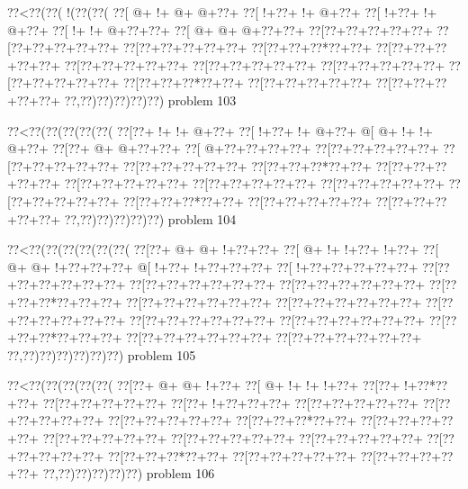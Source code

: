 \vbox{\vbox{\goo
\0??<\0??(\0??(\- !(\0??(\0??(
\0??[\- @+\- !+\- @+\- @+\0??+
\0??[\- !+\0??+\- !+\- @+\0??+
\0??[\- !+\0??+\- !+\- @+\0??+
\0??[\- !+\- !+\- @+\0??+\0??+
\0??[\- @+\- @+\- @+\0??+\0??+
\0??[\0??+\0??+\0??+\0??+\0??+
\0??[\0??+\0??+\0??+\0??+\0??+
\0??[\0??+\0??+\0??+\0??+\0??+
\0??[\0??+\0??+\0??*\0??+\0??+
\0??[\0??+\0??+\0??+\0??+\0??+
\0??[\0??+\0??+\0??+\0??+\0??+
\0??[\0??+\0??+\0??+\0??+\0??+
\0??[\0??+\0??+\0??+\0??+\0??+
\0??[\0??+\0??+\0??+\0??+\0??+
\0??[\0??+\0??+\0??*\0??+\0??+
\0??[\0??+\0??+\0??+\0??+\0??+
\0??[\0??+\0??+\0??+\0??+\0??+
\0??,\0??)\0??)\0??)\0??)\0??)
}
\hfil problem 103\hfil\break
}

\vbox{\vbox{\goo
\0??<\0??(\0??(\0??(\0??(\0??(
\0??[\0??+\- !+\- !+\- @+\0??+
\0??[\- !+\0??+\- !+\- @+\0??+
\- @[\- @+\- !+\- !+\- @+\0??+
\0??[\0??+\- @+\- @+\0??+\0??+
\0??[\- @+\0??+\0??+\0??+\0??+
\0??[\0??+\0??+\0??+\0??+\0??+
\0??[\0??+\0??+\0??+\0??+\0??+
\0??[\0??+\0??+\0??+\0??+\0??+
\0??[\0??+\0??+\0??*\0??+\0??+
\0??[\0??+\0??+\0??+\0??+\0??+
\0??[\0??+\0??+\0??+\0??+\0??+
\0??[\0??+\0??+\0??+\0??+\0??+
\0??[\0??+\0??+\0??+\0??+\0??+
\0??[\0??+\0??+\0??+\0??+\0??+
\0??[\0??+\0??+\0??*\0??+\0??+
\0??[\0??+\0??+\0??+\0??+\0??+
\0??[\0??+\0??+\0??+\0??+\0??+
\0??,\0??)\0??)\0??)\0??)\0??)
}
\hfil problem 104\hfil\break
}

\vbox{\vbox{\goo
\0??<\0??(\0??(\0??(\0??(\0??(\0??(
\0??[\0??+\- @+\- @+\- !+\0??+\0??+
\0??[\- @+\- !+\- !+\0??+\- !+\0??+
\0??[\- @+\- @+\- !+\0??+\0??+\0??+
\- @[\- !+\0??+\- !+\0??+\0??+\0??+
\0??[\- !+\0??+\0??+\0??+\0??+\0??+
\0??[\0??+\0??+\0??+\0??+\0??+\0??+
\0??[\0??+\0??+\0??+\0??+\0??+\0??+
\0??[\0??+\0??+\0??+\0??+\0??+\0??+
\0??[\0??+\0??+\0??*\0??+\0??+\0??+
\0??[\0??+\0??+\0??+\0??+\0??+\0??+
\0??[\0??+\0??+\0??+\0??+\0??+\0??+
\0??[\0??+\0??+\0??+\0??+\0??+\0??+
\0??[\0??+\0??+\0??+\0??+\0??+\0??+
\0??[\0??+\0??+\0??+\0??+\0??+\0??+
\0??[\0??+\0??+\0??*\0??+\0??+\0??+
\0??[\0??+\0??+\0??+\0??+\0??+\0??+
\0??[\0??+\0??+\0??+\0??+\0??+\0??+
\0??,\0??)\0??)\0??)\0??)\0??)\0??)
}
\hfil problem 105\hfil\break
}

\vbox{\vbox{\goo
\0??<\0??(\0??(\0??(\0??(\0??(
\0??[\0??+\- @+\- @+\- !+\0??+
\0??[\- @+\- !+\- !+\- !+\0??+
\0??[\0??+\- !+\0??*\0??+\0??+
\0??[\0??+\0??+\0??+\0??+\0??+
\0??[\0??+\- !+\0??+\0??+\0??+
\0??[\0??+\0??+\0??+\0??+\0??+
\0??[\0??+\0??+\0??+\0??+\0??+
\0??[\0??+\0??+\0??+\0??+\0??+
\0??[\0??+\0??+\0??*\0??+\0??+
\0??[\0??+\0??+\0??+\0??+\0??+
\0??[\0??+\0??+\0??+\0??+\0??+
\0??[\0??+\0??+\0??+\0??+\0??+
\0??[\0??+\0??+\0??+\0??+\0??+
\0??[\0??+\0??+\0??+\0??+\0??+
\0??[\0??+\0??+\0??*\0??+\0??+
\0??[\0??+\0??+\0??+\0??+\0??+
\0??[\0??+\0??+\0??+\0??+\0??+
\0??,\0??)\0??)\0??)\0??)\0??)
}
\hfil problem 106\hfil\break
}


